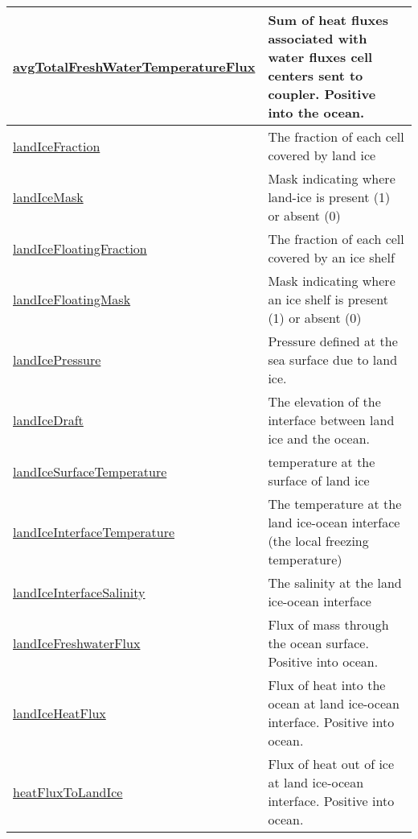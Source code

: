{\begin{center}
\begin{longtable}{| p{2.0in} | p{4.0in} |}
    \hline
    \hyperref[subsec:var_sec_forcing_avgTotalFreshWaterTemperatureFlux]{avgTotalFreshWaterTemperature\-Flux} & Sum of heat fluxes associated with water fluxes cell centers sent to coupler. Positive into the ocean. \\
    \hline
    \hyperref[subsec:var_sec_forcing_landIceFraction]{landIceFraction} & The fraction of each cell covered by land ice \\
    \hline
    \hyperref[subsec:var_sec_forcing_landIceMask]{landIceMask} & Mask indicating where land-ice is present (1) or absent (0) \\
    \hline
    \hyperref[subsec:var_sec_forcing_landIceFloatingFraction]{landIceFloatingFraction} & The fraction of each cell covered by an ice shelf \\
    \hline
    \hyperref[subsec:var_sec_forcing_landIceFloatingMask]{landIceFloatingMask} & Mask indicating where an ice shelf is present (1) or absent (0) \\
    \hline
    \hyperref[subsec:var_sec_forcing_landIcePressure]{landIcePressure} & Pressure defined at the sea surface due to land ice. \\
    \hline
    \hyperref[subsec:var_sec_forcing_landIceDraft]{landIceDraft} & The elevation of the interface between land ice and the ocean. \\
    \hline
    \hyperref[subsec:var_sec_forcing_landIceSurfaceTemperature]{landIceSurfaceTemperature} & temperature at the surface of land ice \\
    \hline
    \hyperref[subsec:var_sec_forcing_landIceInterfaceTemperature]{landIceInterfaceTemperature} & The temperature at the land ice-ocean interface (the local freezing temperature) \\
    \hline
    \hyperref[subsec:var_sec_forcing_landIceInterfaceSalinity]{landIceInterfaceSalinity} & The salinity at the land ice-ocean interface \\
    \hline
    \hyperref[subsec:var_sec_forcing_landIceFreshwaterFlux]{landIceFreshwaterFlux} & Flux of mass through the ocean surface. Positive into ocean. \\
    \hline
    \hyperref[subsec:var_sec_forcing_landIceHeatFlux]{landIceHeatFlux} & Flux of heat into the ocean at land ice-ocean interface. Positive into ocean. \\
    \hline
    \hyperref[subsec:var_sec_forcing_heatFluxToLandIce]{heatFluxToLandIce} & Flux of heat out of ice at land ice-ocean interface. Positive into ocean. \\
    \hline

\end{longtable}
\end{center}}
